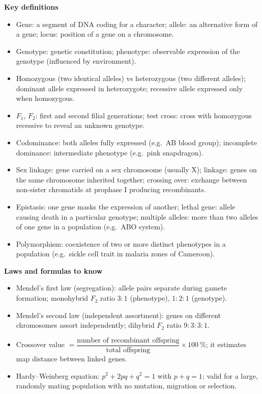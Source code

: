\documentclass[11pt]{article}
\newcommand{\cle}[1]{{\popxbold\color{popdark}#1}}
\begin{document}
\begin{bilan}
\textbf{Key definitions}
\begin{itemize}
\item \cle{Gene}: a segment of DNA coding for a character; \cle{allele}: an alternative form of a gene; \cle{locus}: position of a gene on a chromosome.
\item \cle{Genotype}: genetic constitution; \cle{phenotype}: observable expression of the genotype (influenced by environment).
\item \cle{Homozygous} (two identical alleles) vs \cle{heterozygous} (two different alleles); \cle{dominant} allele expressed in heterozygote; \cle{recessive} allele expressed only when homozygous.
\item $F_1$, $F_2$: first and second filial generations; \cle{test cross}: cross with homozygous recessive to reveal an unknown genotype.
\item \cle{Codominance}: both alleles fully expressed (e.g.\ AB blood group); \cle{incomplete dominance}: intermediate phenotype (e.g.\ pink snapdragon).
\item \cle{Sex linkage}: gene carried on a sex chromosome (usually X); \cle{linkage}: genes on the same chromosome inherited together; \cle{crossing over}: exchange between non-sister chromatids at prophase I producing recombinants.
\item \cle{Epistasis}: one gene masks the expression of another; \cle{lethal gene}: allele causing death in a particular genotype; \cle{multiple alleles}: more than two alleles of one gene in a population (e.g.\ ABO system).
\item \cle{Polymorphism}: coexistence of two or more distinct phenotypes in a population (e.g.\ sickle cell trait in malaria zones of Cameroon).
\end{itemize}

\textbf{Laws and formulas to know}
\begin{itemize}
\item \cle{Mendel's first law} (segregation): allele pairs separate during gamete formation; monohybrid $F_2$ ratio $3:1$ (phenotype), $1:2:1$ (genotype).
\item \cle{Mendel's second law} (independent assortment): genes on different chromosomes assort independently; dihybrid $F_2$ ratio $9:3:3:1$.
\item Crossover value $= \dfrac{\text{number of recombinant offspring}}{\text{total offspring}} \times 100\ \%$; it estimates map distance between linked genes.
\item \cle{Hardy--Weinberg equation}: $p^2 + 2pq + q^2 = 1$ with $p + q = 1$; valid for a large, randomly mating population with no mutation, migration or selection.
\end{itemize}


\end{bilan}
\end{document}
